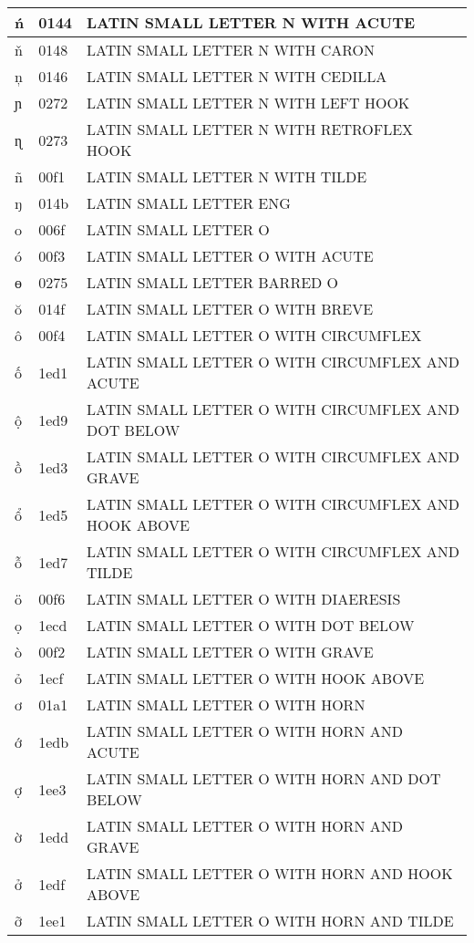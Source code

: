\documentclass[12pt,letterpaper,openany]{book}
\begin{document}
\begin{center}
\begin{supertabular}{|m{0.25in}|m{0.5in}|m{4in}|}
ń & 0144 & LATIN SMALL LETTER N WITH ACUTE\\\hline
ň & 0148 & LATIN SMALL LETTER N WITH CARON\\\hline
ņ & 0146 & LATIN SMALL LETTER N WITH CEDILLA\\\hline
ɲ & 0272 & LATIN SMALL LETTER N WITH LEFT HOOK\\\hline
ɳ & 0273 & LATIN SMALL LETTER N WITH RETROFLEX HOOK\\\hline
ñ & 00f1 & LATIN SMALL LETTER N WITH TILDE\\\hline
ŋ & 014b & LATIN SMALL LETTER ENG\\\hline
o & 006f & LATIN SMALL LETTER O\\\hline
ó & 00f3 & LATIN SMALL LETTER O WITH ACUTE\\\hline
ɵ & 0275 & LATIN SMALL LETTER BARRED O\\\hline
ŏ & 014f & LATIN SMALL LETTER O WITH BREVE\\\hline
ô & 00f4 & LATIN SMALL LETTER O WITH CIRCUMFLEX\\\hline
ố & 1ed1 & LATIN SMALL LETTER O WITH CIRCUMFLEX AND ACUTE\\\hline
ộ & 1ed9 & \scriptsize LATIN SMALL LETTER O WITH CIRCUMFLEX AND DOT BELOW\\\hline
ồ & 1ed3 & LATIN SMALL LETTER O WITH CIRCUMFLEX AND GRAVE\\\hline
ổ & 1ed5 & \scriptsize LATIN SMALL LETTER O WITH CIRCUMFLEX AND HOOK ABOVE\\\hline
ỗ & 1ed7 & LATIN SMALL LETTER O WITH CIRCUMFLEX AND TILDE\\\hline
ö & 00f6 & LATIN SMALL LETTER O WITH DIAERESIS\\\hline
ọ & 1ecd & LATIN SMALL LETTER O WITH DOT BELOW\\\hline
ò & 00f2 & LATIN SMALL LETTER O WITH GRAVE\\\hline
ỏ & 1ecf & LATIN SMALL LETTER O WITH HOOK ABOVE\\\hline
ơ & 01a1 & LATIN SMALL LETTER O WITH HORN\\\hline
ớ & 1edb & LATIN SMALL LETTER O WITH HORN AND ACUTE\\\hline
ợ & 1ee3 & LATIN SMALL LETTER O WITH HORN AND DOT BELOW\\\hline
ờ & 1edd & LATIN SMALL LETTER O WITH HORN AND GRAVE\\\hline
ở & 1edf & LATIN SMALL LETTER O WITH HORN AND HOOK ABOVE\\\hline
ỡ & 1ee1 & LATIN SMALL LETTER O WITH HORN AND TILDE\\\hline

\end{supertabular}
\end{center}
\end{document}
